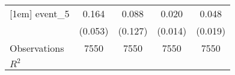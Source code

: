 {\begin{tabular}{l*{4}{c}}
[1em]
event\_5             &       0.164\sym{***}&       0.088         &       0.020         &       0.048\sym{**} \\
                    &     (0.053)         &     (0.127)         &     (0.014)         &     (0.019)         \\
\hline
Observations        &        7550         &        7550         &        7550         &        7550         \\
\(R^{2}\)           &                     &                     &                     &                     \\
\hline\hline
\end{tabular}
}
